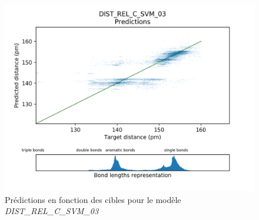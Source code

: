 \begin{figure}[!h]
	\centering
	
	\includegraphics[scale=0.8]{../figures/DIST_REL_C_SVM_03/DIST_REL_C_SVM_03_preds_targets.png}	
	
	\caption{Prédictions en fonction des cibles pour le modèle \emph{DIST\_REL\_C\_SVM\_03}}
	
\end{figure}


